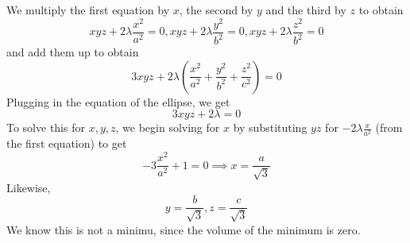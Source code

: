\documentclass{article}
\begin{document}
\begin{enumerate}
  We multiply the first equation by \(x\), the second by \(y\) and the third by \(z\) to obtain
  \[xyz + 2\lambda\frac{x^2}{a^2} = 0, xyz + 2\lambda\frac{y^2}{b^2} = 0, xyz + 2\lambda\frac{z^2}{b^2} = 0\]
  and add them up to obtain
  \[3xyz + 2\lambda\left(\frac{x^2}{a^2} + \frac{y^2}{b^2} + \frac{z^2}{c^2}\right) = 0\]
  Plugging in the equation of the ellipse, we get
  \[3xyz + 2\lambda = 0\]
  To solve this for \(x, y, z\), we begin solving for \(x\) by substituting \(yz\) for \(-2\lambda\frac{x}{a^2}\) (from the first equation) to get
  \[-3\frac{x^2}{a^2} + 1 = 0 \implies x = \frac{a}{\sqrt{3}}\]
  Likewise,
  \[y = \frac{b}{\sqrt{3}}, z = \frac{c}{\sqrt{3}}\]
  We know this is not a minimu, since the volume of the minimum is zero.

\end{enumerate}
\end{document}
